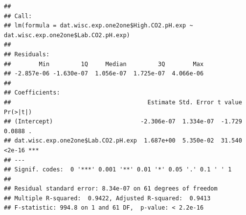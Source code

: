 \documentclass[]{article}
\newenvironment{Shaded}{\begin{snugshade}}{\end{snugshade}}
\newcommand{\DecValTok}[1]{\textcolor[rgb]{0.00,0.00,0.81}{#1}}
\newcommand{\KeywordTok}[1]{\textcolor[rgb]{0.13,0.29,0.53}{\textbf{#1}}}
\newcommand{\NormalTok}[1]{#1}
\newcommand{\OperatorTok}[1]{\textcolor[rgb]{0.81,0.36,0.00}{\textbf{#1}}}
\newcommand{\StringTok}[1]{\textcolor[rgb]{0.31,0.60,0.02}{#1}}
\begin{document}
\begin{Shaded}
\end{Shaded}

\begin{verbatim}
## 
## Call:
## lm(formula = dat.wisc.exp.one2one$High.CO2.pH.exp ~ dat.wisc.exp.one2one$Lab.CO2.pH.exp)
## 
## Residuals:
##        Min         1Q     Median         3Q        Max 
## -2.857e-06 -1.630e-07  1.056e-07  1.725e-07  4.066e-06 
## 
## Coefficients:
##                                       Estimate Std. Error t value Pr(>|t|)    
## (Intercept)                         -2.306e-07  1.334e-07  -1.729   0.0888 .  
## dat.wisc.exp.one2one$Lab.CO2.pH.exp  1.687e+00  5.350e-02  31.540   <2e-16 ***
## ---
## Signif. codes:  0 '***' 0.001 '**' 0.01 '*' 0.05 '.' 0.1 ' ' 1
## 
## Residual standard error: 8.34e-07 on 61 degrees of freedom
## Multiple R-squared:  0.9422, Adjusted R-squared:  0.9413 
## F-statistic: 994.8 on 1 and 61 DF,  p-value: < 2.2e-16
\end{verbatim}

\begin{Shaded}
\end{Shaded}
\end{document}
